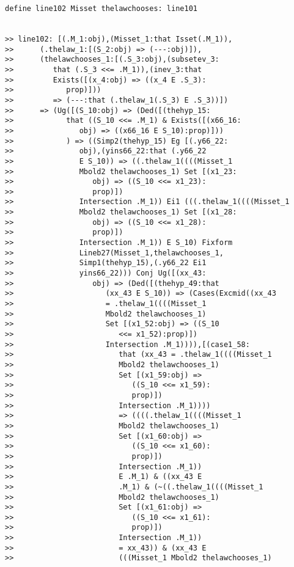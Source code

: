 \documentclass[12pt]{article}
\begin{document}
\begin{verbatim}
define line102 Misset thelawchooses: line101


>> line102: [(.M_1:obj),(Misset_1:that Isset(.M_1)),
>>      (.thelaw_1:[(S_2:obj) => (---:obj)]),
>>      (thelawchooses_1:[(.S_3:obj),(subsetev_3:
>>         that (.S_3 <<= .M_1)),(inev_3:that
>>         Exists([(x_4:obj) => ((x_4 E .S_3):
>>            prop)]))
>>         => (---:that (.thelaw_1(.S_3) E .S_3))])
>>      => (Ug([(S_10:obj) => (Ded([(thehyp_15:
>>            that ((S_10 <<= .M_1) & Exists([(x66_16:
>>               obj) => ((x66_16 E S_10):prop)]))
>>            ) => ((Simp2(thehyp_15) Eg [(.y66_22:
>>               obj),(yins66_22:that (.y66_22
>>               E S_10)) => ((.thelaw_1((((Misset_1
>>               Mbold2 thelawchooses_1) Set [(x1_23:
>>                  obj) => ((S_10 <<= x1_23):
>>                  prop)])
>>               Intersection .M_1)) Ei1 (((.thelaw_1((((Misset_1
>>               Mbold2 thelawchooses_1) Set [(x1_28:
>>                  obj) => ((S_10 <<= x1_28):
>>                  prop)])
>>               Intersection .M_1)) E S_10) Fixform
>>               Lineb27(Misset_1,thelawchooses_1,
>>               Simp1(thehyp_15),(.y66_22 Ei1
>>               yins66_22))) Conj Ug([(xx_43:
>>                  obj) => (Ded([(thehyp_49:that
>>                     (xx_43 E S_10)) => (Cases(Excmid((xx_43
>>                     = .thelaw_1((((Misset_1
>>                     Mbold2 thelawchooses_1)
>>                     Set [(x1_52:obj) => ((S_10
>>                        <<= x1_52):prop)])
>>                     Intersection .M_1)))),[(case1_58:
>>                        that (xx_43 = .thelaw_1((((Misset_1
>>                        Mbold2 thelawchooses_1)
>>                        Set [(x1_59:obj) =>
>>                           ((S_10 <<= x1_59):
>>                           prop)])
>>                        Intersection .M_1))))
>>                        => ((((.thelaw_1((((Misset_1
>>                        Mbold2 thelawchooses_1)
>>                        Set [(x1_60:obj) =>
>>                           ((S_10 <<= x1_60):
>>                           prop)])
>>                        Intersection .M_1))
>>                        E .M_1) & ((xx_43 E
>>                        .M_1) & (~((.thelaw_1((((Misset_1
>>                        Mbold2 thelawchooses_1)
>>                        Set [(x1_61:obj) =>
>>                           ((S_10 <<= x1_61):
>>                           prop)])
>>                        Intersection .M_1))
>>                        = xx_43)) & (xx_43 E
>>                        (((Misset_1 Mbold2 thelawchooses_1)

\end{verbatim}
\end{document}
